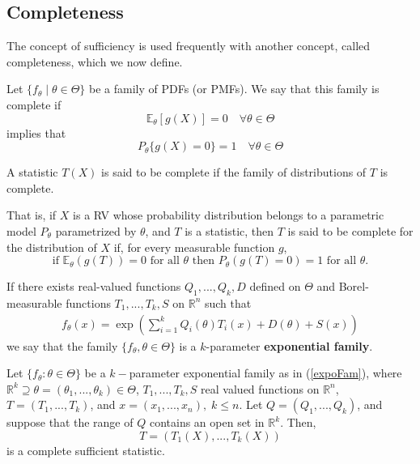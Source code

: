 \documentclass{tufte-handout}
\begin{document}
\subsection{Completeness}%
  \label{sub:Completeness}
  The concept of sufficiency is used frequently with another concept, called completeness,
which we now define.
  \begin{definition}[Completeness]Let $\{f_\theta \mid \theta \in \Theta\}$ be a family of PDFs (or PMFs). We say that this family is complete if
    $$\mathbb{E}_\theta [g(X)] = 0 \quad \forall \theta \in \Theta $$
    implies that 
    $$P_\theta \{ g(X) = 0 \} = 1 \quad \forall \theta \in \Theta  $$
  \end{definition}
  \begin{definition}
    A statistic $T(X)$ is said to be complete if the family of distributions of $T$ is complete.
   
    That is, if $X$ is a RV whose probability distribution belongs to a parametric model $P_\theta$ parametrized by $\theta$, and $T$ is a statistic, then $T$ is said to be complete for the distribution of $X$ if, for every measurable function $g$, 
    $${ {\text{if }}\mathbb{E}_{\theta }(g(T))=0{\text{ for all }}\theta {\text{ then }}{P} _{\theta }(g(T)=0)=1{\text{ for all }}\theta .}$$
  \end{definition}
  \begin{definition}
    If there exists real-valued functions $Q_1, ..., Q_k, D$ defined on $\Theta$ and Borel-measurable functions $T_1,..., T_k,S$ on $\mathbb{R}^n$ such that 
    \begin{equation}
      \label{expoFam}
      \begin{split}
      f_\theta (x) = \exp \left( \sum^{k}_{i=1}  Q_i (\theta)T_i(x) + D(\theta) +S(x)\right) 
      \end{split}
    \end{equation}
    we say that the family $\{f_\theta , \theta \in \Theta\}$ is a $k$-parameter \textbf{exponential family}. 
  \end{definition}
  \begin{theorem}
    Let $\{f_\theta : \theta \in \Theta\}$ be a $k-$parameter exponential family as in (\ref{expoFam}), where $\mathbb{R}^k \supseteq \theta = (\theta_1, ..., \theta_k) \in \Theta$, $T_1,..., T_k, S$ real valued functions on $\mathbb{R}^n$, $T = (T_1,..., T_k)$, and $x = (x_1,..., x_n), \; k\leq n$. Let $Q  =(Q_1, ..., Q_k)$, and suppose that the range of $Q$ contains an open set in $\mathbb{R}^k$. Then, 
    $$T = (T_1(X), ..., T_k(X)) $$
    is a complete sufficient statistic. 
  \end{theorem}
\end{document}
